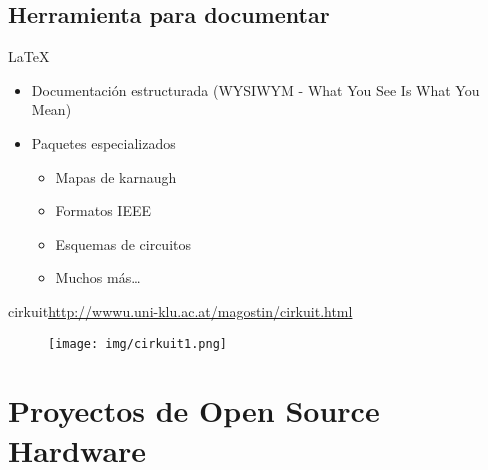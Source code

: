 \documentclass{beamer}
\begin{document}




\subsection{Herramienta para documentar}

\begin{frame}{\LaTeX}
  \begin{itemize}
  \item Documentación estructurada (WYSIWYM - What You See Is What You Mean)
  \item Paquetes especializados
    \begin{itemize}
    \item Mapas de karnaugh
    \item Formatos IEEE
    \item Esquemas de circuitos
    \item Muchos más\dots
    \end{itemize}

  \end{itemize}
\end{frame}

\begin{frame}{cirkuit}{\url{http://wwwu.uni-klu.ac.at/magostin/cirkuit.html}}
  \begin{figure}
    \texttt{[image: img/cirkuit1.png]}
  \end{figure}
\end{frame}


\section{Proyectos de Open Source Hardware}

\end{document}
